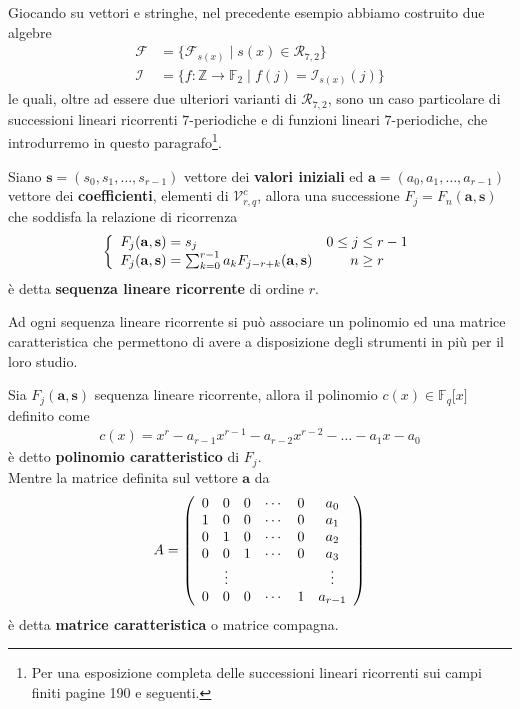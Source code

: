 Giocando su vettori e stringhe, nel precedente esempio abbiamo costruito due algebre
   \begin{align*}
      \mathscr{F} &= \lbrace  \mathscr{F}_{s(x)} \mid s(x) \in \mathcal{R}_{7,2} \rbrace \\
      \mathscr{I} &= \lbrace f:\mathbb{Z} \rightarrow  \mathbb{F}_{2} \mid f(j) = \mathscr{I}_{s(x)}(j) \rbrace
   \end{align*}
le quali, oltre ad essere due ulteriori varianti di $\mathcal{R}_{7,2}$, sono un caso particolare di successioni lineari ricorrenti $7$-periodiche e di funzioni lineari $7$-periodiche, che introdurremo in questo paragrafo\footnote{Per una esposizione completa delle successioni lineari ricorrenti sui campi finiti \cite{lidl} pagine 190 e seguenti.}.
\begin{definizione}
   Siano $\mathbf{s} = (s_0, s_1, \dots , s_{r-1})$ vettore dei {\bf valori iniziali} ed $\mathbf{a} = (a_0, a_1, \dots , a_{r-1})$ vettore dei {\bf coefficienti}, elementi di $\mathcal{V}_{r, q}^{c}$, allora una successione $F_{j} = F_{n}(\mathbf{a},\mathbf{s})$ che soddisfa la relazione di ricorrenza
   \begin{displaymath}
     \left\{
     \begin{array}{l c}
     F_{j}(\mathbf{a},\mathbf{s}) = s_{j} & 0 \leq j \leq r-1 \\
      F_{j}(\mathbf{a},\mathbf{s}) = \sum_{k=0}^{r-1} a_{k} F_{j-r+k}(\mathbf{a},\mathbf{s})  & n \geq r
     \end{array}
     \right.
     \end{displaymath}
   è detta {\bf sequenza lineare ricorrente} di ordine $r$.
\end{definizione}
Ad ogni sequenza lineare ricorrente si può associare un polinomio ed una matrice caratteristica che permettono di avere a disposizione degli strumenti in più per il loro studio.
\begin{definizione}
   Sia $F_{j}(\mathbf{a},\mathbf{s}) $ sequenza lineare ricorrente, allora il polinomio $c(x) \in \mathbb{F}_{q}\lbrack x \rbrack$ definito come
   \begin{align*}
      c(x)= x^{r} - a_{r-1}x^{r-1} - a_{r-2}x^{r-2} - \dots - a_{1}x - a_{0}
   \end{align*}
   è detto {\bf polinomio caratteristico} di $F_{j}$. \\
   Mentre la matrice definita sul vettore $\mathbf{a}$ da
   \begin{align*}
      A =
      \left(
      \begin{array} {c c c c c c}
      0 & 0 & 0 & \cdots & 0 & a_{0}    \\
      1 & 0 & 0 & \cdots & 0 & a_{1}    \\
      0 & 1 & 0 & \cdots & 0 & a_{2}    \\
      0 & 0 & 1 & \cdots & 0 & a_{3}    \\
       & \vdots  &  &  &  & \vdots    \\
      0 & 0 & 0 & \cdots & 1 & a_{r-1}    \\
      \end{array}
      \right)
    \end{align*}
    è detta {\bf matrice caratteristica} o matrice compagna.
\end{definizione}
